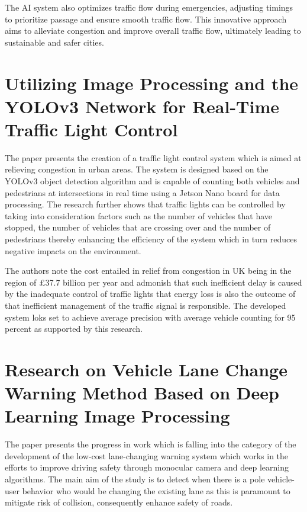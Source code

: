 The AI system also optimizes traffic flow during emergencies, adjusting timings to prioritize passage and ensure smooth traffic flow. This innovative approach aims to alleviate congestion and improve overall traffic flow, ultimately leading to sustainable and safer cities.

\newpage
\section{Utilizing Image Processing and the YOLOv3 Network for Real-Time Traffic Light Control \cite{paper_5}}
The paper presents the creation of a traffic light control system which is aimed at relieving congestion in urban areas. The system is designed based on the YOLOv3 object detection algorithm and is capable of counting both vehicles and pedestrians at intersections in real time using a Jetson Nano board for data processing. The research further shows that traffic lights can be controlled by taking into consideration factors such as the number of vehicles that have stopped, the number of vehicles that are crossing over and the number of pedestrians thereby enhancing the efficiency of the system which in turn reduces negative impacts on the environment.

The authors note the cost entailed in relief from congestion in UK being in the region of £37.7 billion per year and admonish that such inefficient delay is caused by the inadequate control of traffic lights that energy loss is also the outcome of that inefficient management of the traffic signal is responsible. The developed system loks set to achieve average precision with average vehicle counting for 95 percent as supported by this research.



\newpage
\section{Research on Vehicle Lane Change Warning Method Based on Deep Learning Image Processing \cite{paper_6}}
The paper presents the progress in work which is falling into the category of the development of the low-cost lane-changing warning system which works in the efforts to improve driving safety through monocular camera and deep learning algorithms. The main aim of the study is to detect when there is a pole vehicle-user behavior who would be changing the existing lane as this is paramount to mitigate risk of collision, consequently enhance safety of roads.

